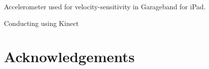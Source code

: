 \documentclass{aes130}
\begin{document}

Accelerometer used for velocity-sensitivity in Garageband for iPad\cite{GaragebandIpadDemo}.

Conducting using Kinect\cite{KinectConductingGameIdea}

\section{Acknowledgements} \label{sec:Acknowledgements}



\end{document}
